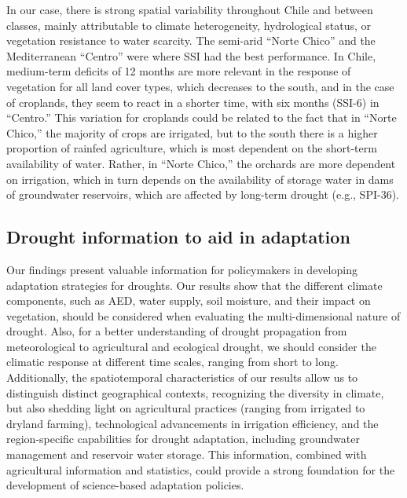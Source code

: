\documentclass[
  authoryear,
  preprint,
  3p,
  onecolumn]{elsarticle}
\begin{document}
In our case, there is strong spatial variability throughout Chile and
between classes, mainly attributable to climate heterogeneity,
hydrological status, or vegetation resistance to water scarcity. The
semi-arid ``Norte Chico'' and the Mediterranean ``Centro'' were where
SSI had the best performance. In Chile, medium-term deficits of 12
months are more relevant in the response of vegetation for all land
cover types, which decreases to the south, and in the case of croplands,
they seem to react in a shorter time, with six months (SSI-6) in
``Centro.'' This variation for croplands could be related to the fact
that in ``Norte Chico,'' the majority of crops are irrigated, but to the
south there is a higher proportion of rainfed agriculture, which is most
dependent on the short-term availability of water. Rather, in ``Norte
Chico,'' the orchards are more dependent on irrigation, which in turn
depends on the availability of storage water in dams of groundwater
reservoirs, which are affected by long-term drought (e.g., SPI-36).

\hypertarget{drought-information-to-aid-in-adaptation}{%
\subsection{Drought information to aid in
adaptation}\label{drought-information-to-aid-in-adaptation}}

Our findings present valuable information for policymakers in developing
adaptation strategies for droughts. Our results show that the different
climate components, such as AED, water supply, soil moisture, and their
impact on vegetation, should be considered when evaluating the
multi-dimensional nature of drought. Also, for a better understanding of
drought propagation \citep{VanLoon2012} from meteorological to
agricultural and ecological drought, we should consider the climatic
response at different time scales, ranging from short to long.
Additionally, the spatiotemporal characteristics of our results allow us
to distinguish distinct geographical contexts, recognizing the diversity
in climate, but also shedding light on agricultural practices (ranging
from irrigated to dryland farming), technological advancements in
irrigation efficiency, and the region-specific capabilities for drought
adaptation, including groundwater management and reservoir water
storage. This information, combined with agricultural information and
statistics, could provide a strong foundation for the development of
science-based adaptation policies.
\end{document}
